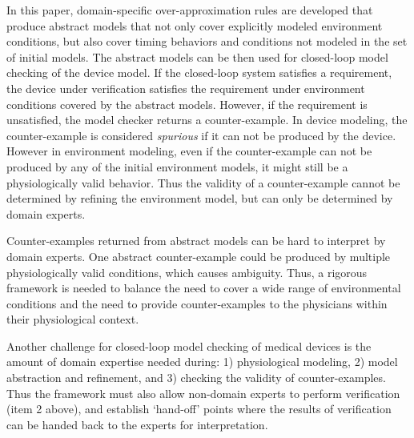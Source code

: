 In this paper, domain-specific over-approximation rules are developed that produce abstract models that not only cover explicitly modeled environment conditions, but also cover timing behaviors and conditions not modeled in the set of initial models. 
The abstract models can be then used for closed-loop model checking of the device model. 
If the closed-loop system satisfies a requirement, the device under verification satisfies the requirement under environment conditions covered by the abstract models. 
However, if the requirement is unsatisfied, the model checker returns a counter-example. 
In device modeling, the counter-example is considered \emph{spurious} if it can not be produced by the device.
However in environment modeling, even if the counter-example can not be produced by any of the initial environment models, it might still be a physiologically valid behavior.
Thus the validity of a counter-example cannot be determined by refining the environment model, but can only be determined by domain experts. 

Counter-examples returned from abstract models can be hard to interpret by domain experts.
One abstract counter-example could be produced by multiple physiologically valid conditions, which causes ambiguity.
Thus, a rigorous framework is needed to balance the need to cover a wide range of environmental conditions and the need to provide counter-examples to the physicians within their physiological context.

Another challenge for closed-loop model checking of medical devices is the amount of domain expertise needed during: 1) physiological modeling, 2) model abstraction and refinement, and 3) checking the validity of counter-examples.
Thus the framework must also allow non-domain experts to perform verification (item 2 above),
and establish `hand-off' points where the results of verification can be handed back 
to the experts for interpretation.

